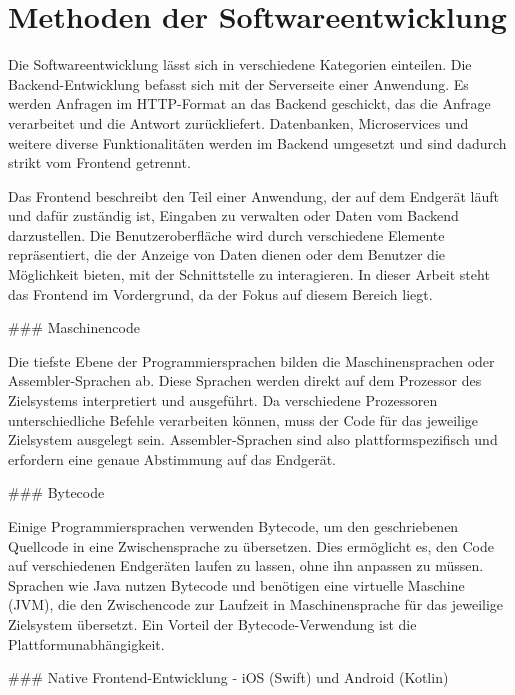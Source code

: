 \documentclass[a4paper,12pt]{article}
\begin{document}
\section{Methoden der Softwareentwicklung}
Die Softwareentwicklung lässt sich in verschiedene Kategorien einteilen. Die Backend-Entwicklung befasst sich mit der Serverseite einer Anwendung. Es werden Anfragen im HTTP-Format an das Backend geschickt, das die Anfrage verarbeitet und die Antwort zurückliefert. Datenbanken, Microservices und weitere diverse Funktionalitäten werden im Backend umgesetzt und sind dadurch strikt vom Frontend getrennt.

\vspace{0.5cm}

Das Frontend beschreibt den Teil einer Anwendung, der auf dem Endgerät läuft und dafür zuständig ist, Eingaben zu verwalten oder Daten vom Backend darzustellen. Die Benutzeroberfläche wird durch verschiedene Elemente repräsentiert, die der Anzeige von Daten dienen oder dem Benutzer die Möglichkeit bieten, mit der Schnittstelle zu interagieren. In dieser Arbeit steht das Frontend im Vordergrund, da der Fokus auf diesem Bereich liegt.

\vspace{0.5cm}

### Maschinencode

Die tiefste Ebene der Programmiersprachen bilden die Maschinensprachen oder Assembler-Sprachen ab. Diese Sprachen werden direkt auf dem Prozessor des Zielsystems interpretiert und ausgeführt. Da verschiedene Prozessoren unterschiedliche Befehle verarbeiten können, muss der Code für das jeweilige Zielsystem ausgelegt sein. Assembler-Sprachen sind also plattformspezifisch und erfordern eine genaue Abstimmung auf das Endgerät.

\vspace{0.5cm}

### Bytecode

Einige Programmiersprachen verwenden Bytecode, um den geschriebenen Quellcode in eine Zwischensprache zu übersetzen. Dies ermöglicht es, den Code auf verschiedenen Endgeräten laufen zu lassen, ohne ihn anpassen zu müssen. Sprachen wie Java nutzen Bytecode und benötigen eine virtuelle Maschine (JVM), die den Zwischencode zur Laufzeit in Maschinensprache für das jeweilige Zielsystem übersetzt. Ein Vorteil der Bytecode-Verwendung ist die Plattformunabhängigkeit.

\vspace{0.5cm}

### Native Frontend-Entwicklung - iOS (Swift) und Android (Kotlin)
\end{document}
